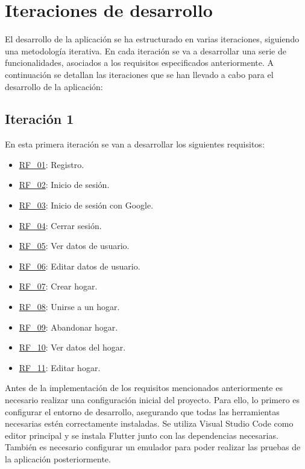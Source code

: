 \section{Iteraciones de desarrollo}
\label{sec:iteracciones}
El desarrollo de la aplicación se ha estructurado en varias iteraciones, siguiendo una metodología iterativa. 
En cada iteración se va a desarrollar una serie de funcionalidades, asociados a los requisitos especificados anteriormente. 
A continuación se detallan las iteraciones que se han llevado a cabo para el desarrollo de la aplicación:

\subsection{Iteración 1}

En esta primera iteración se van a desarrollar los siguientes requisitos:
\begin{itemize}
    \item {\hyperref[req:RF01]{RF\_01}}: Registro.
    \item {\hyperref[req:RF02]{RF\_02}}: Inicio de sesión.
    \item {\hyperref[req:RF03]{RF\_03}}: Inicio de sesión con Google.
    \item {\hyperref[req:RF04]{RF\_04}}: Cerrar sesión.
    \item {\hyperref[req:RF05]{RF\_05}}: Ver datos de usuario.
    \item {\hyperref[req:RF06]{RF\_06}}: Editar datos de usuario.
    \item {\hyperref[req:RF07]{RF\_07}}: Crear hogar.
    \item {\hyperref[req:RF08]{RF\_08}}: Unirse a un hogar.
    \item {\hyperref[req:RF09]{RF\_09}}: Abandonar hogar.
    \item {\hyperref[req:RF10]{RF\_10}}: Ver datos del hogar.
    \item {\hyperref[req:RF11]{RF\_11}}: Editar hogar.
\end{itemize}

Antes de la implementación de los requisitos mencionados anteriormente es necesario realizar una configuración inicial del proyecto.
Para ello, lo primero es configurar el entorno de desarrollo, asegurando que todas las herramientas necesarias estén correctamente 
instaladas. Se utiliza Visual Studio Code como editor principal y se instala Flutter junto con las dependencias necesarias. 
También es necesario configurar un emulador para poder realizar las pruebas de la aplicación posteriormente. 

